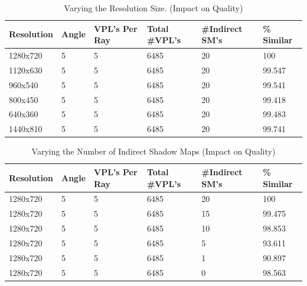 \begin{table}[h!]
	\caption{Varying the Resolution Size. (Impact on Quality)}
	\begin{center}
	    \begin{tabular}{ | l | l | l | l | l | l |}
	    \hline
	    Resolution & Angle & VPL's Per Ray & Total \#VPL's & \#Indirect SM's & \% Similar\\ \hline
	    1280x720 & 5 & 5 & 6485 & 20 & 100\\ \hline
	    1120x630 & 5 & 5 & 6485 & 20 & 99.547\\ \hline
	    960x540 & 5 & 5 & 6485 & 20 & 99.541\\ \hline
	    800x450 & 5 & 5 & 6485 & 20 & 99.418\\ \hline
	    640x360 & 5 & 5 & 6485 & 20 & 99.483\\ \hline
	    1440x810 & 5 & 5 & 6485 & 20 & 99.741\\ \hline
	    \end{tabular}
	\end{center}
	\label{table:5.7}
\end{table}

\begin{table}[h!]
	\caption{Varying the Number of Indirect Shadow Maps (Impact on Quality)}
	\begin{center}
	    \begin{tabular}{ | l | l | l | l | l | l |}
	    \hline
	    Resolution & Angle & VPL's Per Ray & Total \#VPL's & \#Indirect SM's & \% Similar\\ \hline
	    1280x720 & 5 & 5 & 6485 & 20 & 100\\ \hline
	    1280x720 & 5 & 5 & 6485 & 15 & 99.475\\ \hline
	    1280x720 & 5 & 5 & 6485 & 10 & 98.853\\ \hline
	    1280x720 & 5 & 5 & 6485 & 5 & 93.611\\ \hline
	    1280x720 & 5 & 5 & 6485 & 1 & 90.897\\ \hline
	    1280x720 & 5 & 5 & 6485 & 0 & 98.563\\ \hline
	    \end{tabular}
	\end{center}
	\label{table:5.8}
\end{table}

